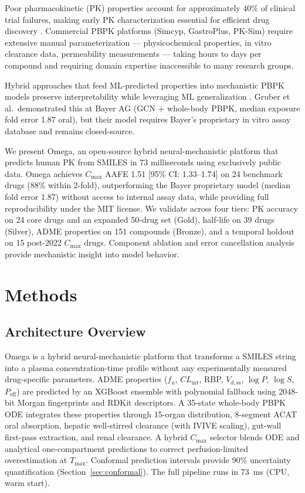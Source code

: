 \documentclass[review,3p]{elsarticle}
\begin{document}
Poor pharmacokinetic (PK) properties account for approximately 40\% of clinical trial failures, making early PK characterization essential for efficient drug discovery \cite{kola2004attrition}. Commercial PBPK platforms (Simcyp, GastroPlus, PK-Sim) require extensive manual parameterization --- physicochemical properties, in vitro clearance data, permeability measurements --- taking hours to days per compound and requiring domain expertise inaccessible to many research groups.

Hybrid approaches that feed ML-predicted properties into mechanistic PBPK models preserve interpretability while leveraging ML generalization \cite{gruber2024hybrid}. Gruber et al.\ demonstrated this at Bayer AG (GCN + whole-body PBPK, median exposure fold error 1.87 oral), but their model requires Bayer's proprietary in vitro assay database and remains closed-source.

We present Omega, an open-source hybrid neural-mechanistic platform that predicts human PK from SMILES in 73 milliseconds using exclusively public data. Omega achieves $C_{\max}$ AAFE 1.51 [95\% CI: 1.33--1.74] on 24 benchmark drugs (88\% within 2-fold), outperforming the Bayer proprietary model (median fold error 1.87) without access to internal assay data, while providing full reproducibility under the MIT license. We validate across four tiers: PK accuracy on 24 core drugs and an expanded 50-drug set (Gold), half-life on 39 drugs (Silver), ADME properties on 151 compounds (Bronze), and a temporal holdout on 15 post-2022 $C_{\max}$ drugs. Component ablation and error cancellation analysis provide mechanistic insight into model behavior.


\section{Methods}
\label{sec:methods}

\subsection{Architecture Overview}
\label{sec:architecture}

Omega is a hybrid neural-mechanistic platform that transforms a SMILES string into a plasma concentration-time profile without any experimentally measured drug-specific parameters. ADME properties ($f_u$, $CL_{\text{int}}$, RBP, $V_{d,\text{ss}}$, $\log P$, $\log S$, $P_{\text{eff}}$) are predicted by an XGBoost ensemble with polynomial fallback using 2048-bit Morgan fingerprints and RDKit descriptors. A 35-state whole-body PBPK ODE integrates these properties through 15-organ distribution, 8-segment ACAT oral absorption, hepatic well-stirred clearance (with IVIVE scaling), gut-wall first-pass extraction, and renal clearance. A hybrid $C_{\max}$ selector blends ODE and analytical one-compartment predictions to correct perfusion-limited overestimation at $T_{\max}$. Conformal prediction intervals provide 90\% uncertainty quantification (Section~\ref{sec:conformal}). The full pipeline runs in 73~ms (CPU, warm start).
\end{document}
